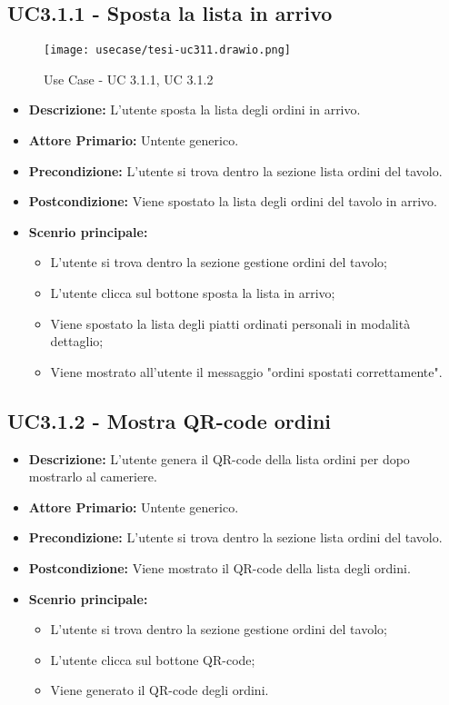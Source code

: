 \subsection{UC3.1.1 - Sposta la lista in arrivo}
\begin{figure}[H]
    \centering
    \texttt{[image: usecase/tesi-uc311.drawio.png]}
    \caption{Use Case - UC 3.1.1, UC 3.1.2}
\end{figure}
\begin{itemize}
    \item \textbf{Descrizione:} L'utente sposta la lista degli ordini in arrivo.
    \item \textbf{Attore Primario:} Untente generico.
    \item \textbf{Precondizione:} L'utente si trova dentro la sezione lista ordini del tavolo.
    \item \textbf{Postcondizione:} Viene spostato la lista degli ordini del tavolo in arrivo.
    \item \textbf{Scenrio principale:}
    \begin{itemize}
        \item L'utente si trova dentro la sezione gestione ordini del tavolo;
        \item L'utente clicca sul bottone sposta la lista in arrivo;
        \item Viene spostato la lista degli piatti ordinati personali in modalità dettaglio;
        \item Viene mostrato all'utente il messaggio "ordini spostati correttamente".
    \end{itemize}
\end{itemize}
\subsection{UC3.1.2 - Mostra QR-code ordini}
\begin{itemize}
    \item \textbf{Descrizione:} L'utente genera il QR-code della lista ordini per dopo mostrarlo al cameriere.
    \item \textbf{Attore Primario:} Untente generico.
    \item \textbf{Precondizione:} L'utente si trova dentro la sezione lista ordini del tavolo.
    \item \textbf{Postcondizione:} Viene mostrato il QR-code della lista degli ordini.
    \item \textbf{Scenrio principale:}
    \begin{itemize}
        \item L'utente si trova dentro la sezione gestione ordini del tavolo;
        \item L'utente clicca sul bottone QR-code;
        \item Viene generato il QR-code degli ordini.
    \end{itemize}
\end{itemize}
